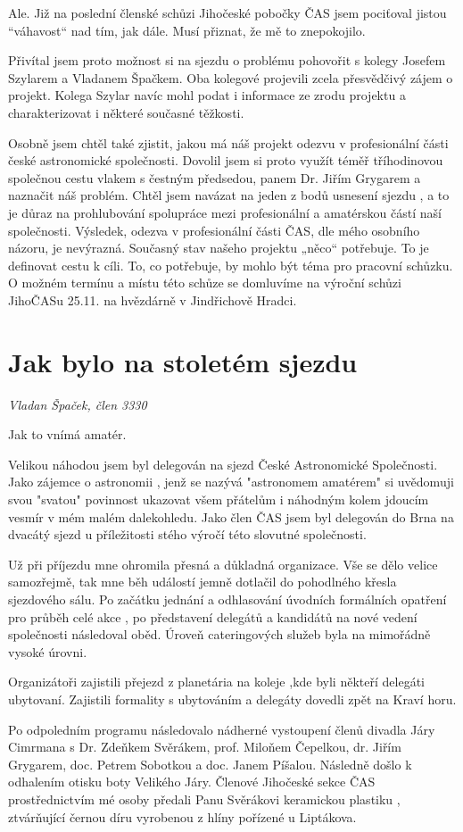 \documentclass[10pt,a5paper,twoside]{book}
\newcommand{\nadpis}[2]{
\section*{#1}
	\begin{flushright}
	\textit{#2}
	\end{flushright}
}
\begin{document}
Ale. Již na poslední členské schůzi Jihočeské pobočky ČAS jsem pociťoval jistou “váhavost“ nad tím, jak dále. Musí přiznat, že mě to znepokojilo.


Přivítal jsem proto možnost si na sjezdu o problému pohovořit s kolegy Josefem Szylarem a Vladanem Špačkem. Oba kolegové projevili zcela přesvědčivý zájem o projekt. Kolega Szylar navíc mohl podat i informace ze zrodu projektu a charakterizovat i některé současné těžkosti.



Osobně jsem chtěl také zjistit, jakou má náš projekt odezvu v profesionální části české astronomické společnosti. Dovolil jsem si proto využít téměř tříhodinovou společnou cestu vlakem s čestným předsedou, panem Dr. Jiřím Grygarem a naznačit náš problém. Chtěl jsem navázat na jeden z bodů usnesení sjezdu , a to je důraz na prohlubování spolupráce mezi profesionální a amatérskou částí naší společnosti. Výsledek, odezva v profesionální části ČAS, dle mého osobního názoru, je nevýrazná.
Současný stav našeho projektu „něco“ potřebuje. To je definovat cestu k cíli. To, co potřebuje, by mohlo být téma pro pracovní schůzku. O možném termínu a místu této schůze se domluvíme na výroční schůzi JihoČASu 25.11. na hvězdárně v Jindřichově Hradci.



\nadpis{Jak bylo na stoletém sjezdu
}{Vladan Špaček, člen 3330}
Jak to vnímá amatér.


Velikou náhodou jsem byl delegován na sjezd České Astronomické Společnosti. Jako zájemce o astronomii , jenž se nazývá  "astronomem  amatérem" si uvědomuji svou "svatou"  povinnost ukazovat všem přátelům i náhodným kolem jdoucím vesmír v mém malém dalekohledu.  Jako člen ČAS jsem byl delegován do Brna na dvacátý sjezd u příležitosti  stého výročí této slovutné společnosti.


Už při příjezdu mne ohromila přesná a důkladná organizace. Vše se dělo velice samozřejmě, tak mne běh událostí jemně dotlačil do pohodlného křesla sjezdového sálu. Po začátku jednání a odhlasování úvodních formálních opatření pro průběh celé akce , po představení delegátů a kandidátů na nové vedení  společnosti následoval oběd. Úroveň cateringových služeb byla na mimořádně vysoké úrovni.


Organizátoři zajistili přejezd z planetária na koleje ,kde byli někteří delegáti ubytovaní. Zajistili formality s ubytováním a delegáty dovedli zpět na Kraví horu.


Po odpoledním programu následovalo nádherné vystoupení členů divadla Járy Cimrmana s  Dr. Zdeňkem  Svěrákem, prof. Miloňem Čepelkou, dr. Jiřím Grygarem, doc. Petrem Sobotkou a doc. Janem  Píšalou. Následně došlo k odhalením otisku boty Velikého Járy. Členové Jihočeské sekce ČAS prostřednictvím mé osoby předali  Panu Svěrákovi keramickou plastiku , ztvárňující černou díru vyrobenou z hlíny pořízené u Liptákova.
\end{document}
